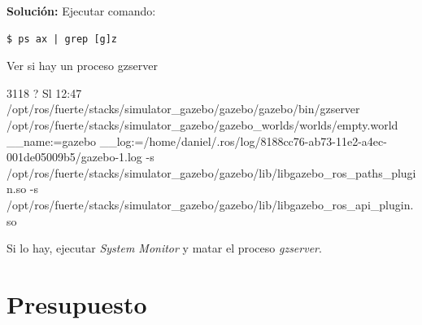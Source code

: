 \documentclass[12pt, a4paper]{report}
\begin{document}
\textbf{Solución: }
Ejecutar comando:
\begin{verbatim}
$ ps ax | grep [g]z
\end{verbatim}

Ver si hay un proceso gzserver

\begin{spverbatim}
 3118 ?        Sl    12:47
 /opt/ros/fuerte/stacks/simulator_gazebo/gazebo/gazebo/bin/gzserver 
 /opt/ros/fuerte/stacks/simulator_gazebo/gazebo_worlds/worlds/empty.world __name:=gazebo __log:=/home/daniel/.ros/log/8188cc76-ab73-11e2-a4ec-001de05009b5/gazebo-1.log -s /opt/ros/fuerte/stacks/simulator_gazebo/gazebo/lib/libgazebo_ros_paths_plugin.so -s /opt/ros/fuerte/stacks/simulator_gazebo/gazebo/lib/libgazebo_ros_api_plugin.so
\end{spverbatim}

Si lo hay, ejecutar \textit{System Monitor} y matar el proceso \textit{gzserver}.

\part{Presupuesto}

\end{document}
